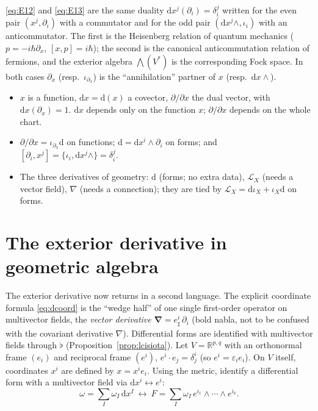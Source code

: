 \documentclass[11pt,a4paper]{article}
\numberwithin{equation}{section}
\theoremstyle{definition}
\theoremstyle{plain}
\newcommand{\R}{\mathbb{R}}
\newcommand{\dd}{\mathrm{d}}
\newcommand{\Lie}{\mathcal{L}}
\newcommand{\vd}{\boldsymbol{\nabla}}               %
\begin{document}
\begin{remark}
\eqref{eq:E12} and \eqref{eq:E13} are the same duality $\dd x^j(\partial_i)=\delta^j_i$ written for the even pair $(x^j,\partial_i)$ with a commutator and for the odd pair $(\dd x^j\wedge,\iota_i)$ with an anticommutator.
The first is the Heisenberg relation of quantum mechanics ($p=-i\hbar\partial_x$, $[x,p]=i\hbar$); the second is the canonical anticommutation relation of fermions, and the exterior algebra $\bigwedge(V^*)$ is the corresponding Fock space.
In both cases $\partial_x$ (resp.\ $\iota_{\partial_x}$) is the ``annihilation'' partner of $x$ (resp.\ $\dd x\wedge$).
\end{remark}

\begin{keypoints}
\begin{itemize}
\item $x$ is a function, $\dd x=\dd(x)$ a covector, $\partial/\partial x$ the dual vector, with $\dd x(\partial_x)=1$. $\dd x$ depends only on the function $x$; $\partial/\partial x$ depends on the whole chart.
\item $\partial/\partial x=\iota_{\partial_x}\dd$ on functions; $\dd=\dd x^i\wedge\partial_i$ on forms; and $[\partial_i,x^j]=\{\iota_i,\dd x^j\wedge\}=\delta^j_i$.
\item The three derivatives of geometry: $\dd$ (forms; no extra data), $\Lie_X$ (needs a vector field), $\nabla$ (needs a connection); they are tied by $\Lie_X=\dd\iota_X+\iota_X\dd$ on forms.
\end{itemize}
\end{keypoints}

\section{The exterior derivative in geometric algebra}\label{sec:ga-calculus}

The exterior derivative now returns in a second language. The explicit coordinate formula \eqref{eq:dcoord} is the ``wedge half'' of one single first-order operator on multivector fields, the \emph{vector derivative}
$\vd=e^i_\sharp\,\partial_i$ (bold nabla, not to be confused with the covariant derivative $\nabla$). Differential forms are identified with multivector fields through $\flat$ (Proposition~\ref{prop:lcisiota}).
Let $V=\R^{p,q}$ with an orthonormal frame $(e_i)$ and reciprocal frame $(e^i)$, $e^i\cdot e_j=\delta^i_j$ (so $e^i=\varepsilon_ie_i$). On $V$ itself, coordinates $x^i$ are defined by $x=x^ie_i$. Using the metric, identify a differential form with a multivector field via $\dd x^i\leftrightarrow e^i$:
\[
 \omega=\sum_I\omega_I\,\dd x^I\ \longleftrightarrow\ F=\sum_I\omega_I\,e^{i_1}\wedge\cdots\wedge e^{i_k}.
\]
\end{document}
